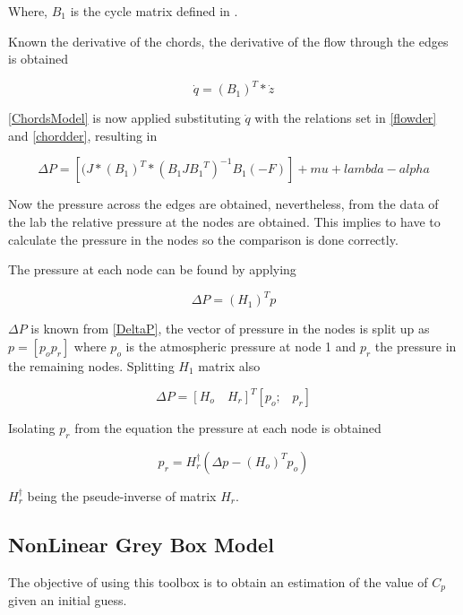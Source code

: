Where, $B_1$ is the cycle matrix defined in . 

Known the derivative of the chords, the derivative of the flow through the edges is obtained

\begin{equation}
  \dot{q}  = (B_1)^T * \dot{z}
  \label{flowder}
\end{equation}

\eqref{ChordsModel} is now applied substituting $\dot{q}$ with the relations set in \eqref{flowder} and \eqref{chordder}, resulting in

\begin{equation}
  \Delta P = [(J*(B_1)^T * (B_1 J {B_1}^T)^{-1}B_1 (-F)]+mu+lambda-alpha
  \label{DeltaP}
\end{equation}

Now the pressure across the edges are obtained, nevertheless, from the data of the lab the relative pressure at the nodes are obtained. This implies to 
have to calculate the pressure in the nodes so the comparison is done correctly. 

The pressure at each node can be found by applying 

\begin{equation}
  \Delta P = (H_1)^T p
\end{equation}

$\Delta P$ is known from \eqref{DeltaP}, the vector of pressure in the nodes is split up as $p = [p_o p_r]$ where $p_o$ is the atmospheric pressure at 
node 1 and $p_r$ the pressure in the remaining nodes. Splitting $H_1$ matrix also

\begin{equation}
  \Delta P = [H_o \quad H_r]^T [p_o \text{;} \quad p_r]
\end{equation}

Isolating $p_r$ from the equation the pressure at each node is obtained

\begin{equation}
  p_r = H_r^{\dagger} (\Delta p - (H_o)^{T} p_o)
\end{equation}

$H_r^{\dagger}$ being the pseude-inverse of matrix $H_r$.

\subsection{NonLinear Grey Box Model}
The objective of using this toolbox is to obtain an estimation of the value of $C_p$ given an initial guess. 




